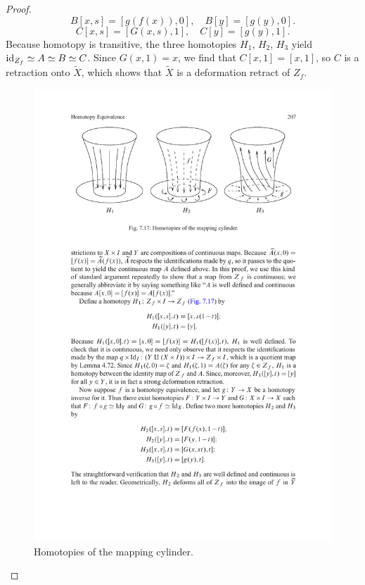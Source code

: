 \begin{proof}
\[B[x,s]=[g(f(x)),0],\quad B[y]=[g(y),0].\]
\[C[x,s]=[G(x,s),1],\quad C[y]=[g(y),1].\]
Because homotopy is transitive, the three homotopies $H_1$, $H_2$, $H_3$ yield $\mathrm{id}_{Z_f}\simeq A\simeq B\simeq C$. Since $G(x,1)=x$, we find that $C[x,1]=[x,1]$, so $C$ is a retraction onto $\widetilde{X}$, which shows that $\widetilde{X}$ is a deformation retract of $Z_f$.
\begin{figure}[htbp]
\centering
\includegraphics{retraction}
\caption{Homotopies of the mapping cylinder.}
\end{figure}
\end{proof}
